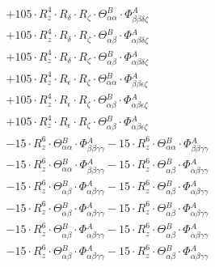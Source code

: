 \documentclass{article}
\begin{document}
\begin{subequations}
\begin{gather}
\begin{array}{c}
 \\[0.2em] 		 + 105 \cdot R_{z}^{4} \cdot R_{\delta{}} \cdot R_{\zeta{}} \cdot \Theta{}^{B}_{\alpha{}\alpha{}} \cdot \Phi{}^{A}_{\beta{}\beta{}\delta{}\zeta{}} 
 \\[0.2em] 		 + 105 \cdot R_{z}^{4} \cdot R_{\delta{}} \cdot R_{\zeta{}} \cdot \Theta{}^{B}_{\alpha{}\beta{}} \cdot \Phi{}^{A}_{\alpha{}\beta{}\delta{}\zeta{}} 
 \\[0.2em] 		 + 105 \cdot R_{z}^{4} \cdot R_{\delta{}} \cdot R_{\zeta{}} \cdot \Theta{}^{B}_{\alpha{}\beta{}} \cdot \Phi{}^{A}_{\alpha{}\beta{}\delta{}\zeta{}} 
 \\[0.2em] 		 + 105 \cdot R_{z}^{4} \cdot R_{\epsilon{}} \cdot R_{\zeta{}} \cdot \Theta{}^{B}_{\alpha{}\alpha{}} \cdot \Phi{}^{A}_{\beta{}\beta{}\epsilon{}\zeta{}} 
 \\[0.2em] 		 + 105 \cdot R_{z}^{4} \cdot R_{\epsilon{}} \cdot R_{\zeta{}} \cdot \Theta{}^{B}_{\alpha{}\beta{}} \cdot \Phi{}^{A}_{\alpha{}\beta{}\epsilon{}\zeta{}} 
 \\[0.2em] 		 + 105 \cdot R_{z}^{4} \cdot R_{\epsilon{}} \cdot R_{\zeta{}} \cdot \Theta{}^{B}_{\alpha{}\beta{}} \cdot \Phi{}^{A}_{\alpha{}\beta{}\epsilon{}\zeta{}} 
 \\[0.2em] 		 - 15 \cdot R_{z}^{6} \cdot \Theta{}^{B}_{\alpha{}\alpha{}} \cdot \Phi{}^{A}_{\beta{}\beta{}\gamma{}\gamma{}}- 15 \cdot R_{z}^{6} \cdot \Theta{}^{B}_{\alpha{}\alpha{}} \cdot \Phi{}^{A}_{\beta{}\beta{}\gamma{}\gamma{}} 
 \\[0.2em] 		 - 15 \cdot R_{z}^{6} \cdot \Theta{}^{B}_{\alpha{}\alpha{}} \cdot \Phi{}^{A}_{\beta{}\beta{}\gamma{}\gamma{}}- 15 \cdot R_{z}^{6} \cdot \Theta{}^{B}_{\alpha{}\beta{}} \cdot \Phi{}^{A}_{\alpha{}\beta{}\gamma{}\gamma{}} 
 \\[0.2em] 		 - 15 \cdot R_{z}^{6} \cdot \Theta{}^{B}_{\alpha{}\beta{}} \cdot \Phi{}^{A}_{\alpha{}\beta{}\gamma{}\gamma{}}- 15 \cdot R_{z}^{6} \cdot \Theta{}^{B}_{\alpha{}\beta{}} \cdot \Phi{}^{A}_{\alpha{}\beta{}\gamma{}\gamma{}} 
 \\[0.2em] 		 - 15 \cdot R_{z}^{6} \cdot \Theta{}^{B}_{\alpha{}\beta{}} \cdot \Phi{}^{A}_{\alpha{}\beta{}\gamma{}\gamma{}}- 15 \cdot R_{z}^{6} \cdot \Theta{}^{B}_{\alpha{}\beta{}} \cdot \Phi{}^{A}_{\alpha{}\beta{}\gamma{}\gamma{}} 
 \\[0.2em] 		 - 15 \cdot R_{z}^{6} \cdot \Theta{}^{B}_{\alpha{}\beta{}} \cdot \Phi{}^{A}_{\alpha{}\beta{}\gamma{}\gamma{}}- 15 \cdot R_{z}^{6} \cdot \Theta{}^{B}_{\alpha{}\beta{}} \cdot \Phi{}^{A}_{\alpha{}\beta{}\gamma{}\gamma{}} 
 \\[0.2em] 		 - 15 \cdot R_{z}^{6} \cdot \Theta{}^{B}_{\alpha{}\beta{}} \cdot \Phi{}^{A}_{\alpha{}\beta{}\gamma{}\gamma{}}- 15 \cdot R_{z}^{6} \cdot \Theta{}^{B}_{\alpha{}\beta{}} \cdot \Phi{}^{A}_{\alpha{}\beta{}\gamma{}\gamma{}} 

\end{array}
\end{gather}
\end{subequations}
\end{document}
